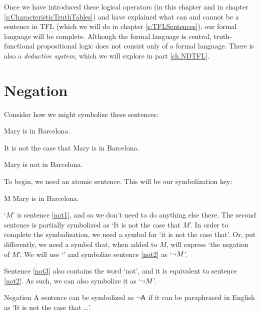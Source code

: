 Once we have introduced these logical operators (in this chapter and in chapter \ref{s:CharacteristicTruthTables}) and have explained what can and cannot be a sentence in TFL (which we will do in chapter \ref{s:TFLSentences}), our formal language will be complete. Although the formal language is central, truth-functional propositional logic does not consist only of a formal language. There is also a \textit{deductive system}, which we will explore in part \ref{ch.NDTFL}. 

        
\section{Negation}

Consider how we might symbolize these sentences:
	\begin{earg}
	\item[\ex{not1}] Mary is in Barcelona.
	\item[\ex{not2}] It is not the case that Mary is in Barcelona.
	\item[\ex{not3}] Mary is not in Barcelona.
	\end{earg}
To begin, we need an atomic sentence. This will be our symbolization key:
	\begin{ekey}
		\item[M] Mary is in Barcelona.
	\end{ekey}
	
`$M$' is sentence \ref{not1}, and so we don't need to do anything else there. 
The second sentence is partially symbolized as `It is not the case that $M$'. In order to complete the symbolization, we need a symbol for `it is not the case that'. Or, put differently, we need a symbol that, when added to $M$, will express `the negation of $M$'. We will use `\enot' and symbolize sentence \ref{not2} as `${\neg} M$'.

Sentence \ref{not3} also contains the word `not', and it is equivalent to sentence \ref{not2}. As such, we can also symbolize it as `${\neg} M$'.

\begin{factboxy}{Negation}
A sentence can be symbolized as ${\neg}\mathsf{A}$ if it can be paraphrased in English as `It is not the case that \ldots'.
\end{factboxy}

